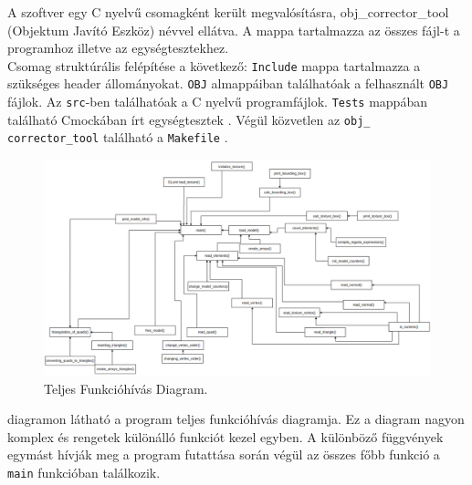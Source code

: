 A szoftver egy C nyelvű csomagként került megvalósításra, obj\_corrector\_tool (Objektum Javító Eszköz) névvel ellátva. A mappa tartalmazza az összes fájl-t a programhoz illetve az egységtesztekhez.\\

Csomag struktúrális felépítése a következő:
\bigskip
{}
\newpage
\texttt{Include} mappa tartalmazza a szükséges header állományokat.  \texttt{OBJ} almappáiban találhatóak a felhasznált \texttt{OBJ} fájlok. Az \texttt{src}-ben találhatóak a C nyelvű programfájlok. \texttt{Tests} mappában található Cmockában írt egységtesztek . Végül közvetlen az \texttt{obj\_\\corrector\_tool} található a \texttt{Makefile} .\\

\begin{figure}[h]
\centering
\includegraphics[width=\textwidth]{images/func.png}
\caption{Teljes Funkcióhívás Diagram.}
\label{fig:funk}
\end{figure}

 diagramon látható a program teljes funkcióhívás diagramja. Ez a diagram nagyon komplex és rengetek különálló funkciót kezel egyben. A különböző függvények egymást hívják meg a program futattása során végül az összes főbb funkció a \texttt{main} funkcióban találkozik.\\

